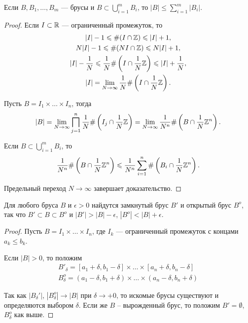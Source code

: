 \begin{property}
    \label{brus-prop1}
    Если $B, B_1, \ldots, B_m$ --- брусы и $B \subset \bigcup_{i = 1}^m B_i$, то $|B| \le \sum_{i = 1}^m |B_i|$.

    \begin{proof}
        Если $I \subset \mathbb{R}$ --- ограниченный промежуток, то
        \begin{gather*}
            |I| - 1 \leqslant \#(I \cap \mathbb{Z}) \leqslant |I| + 1,\\
            N|I| - 1 \leqslant \#(NI \cap \mathbb{Z}) \leqslant N|I| + 1,\\
            |I| - \frac{1}{N} \leqslant \frac{1}{N}\#\left(I \cap \frac{1}{N}\mathbb{Z}\right) \leqslant |I| + \frac{1}{N},\\
            |I| = \lim_{N \rightarrow \infty} \frac{1}{N}\#\left(I \cap \frac{1}{N}\mathbb{Z}\right).
        \end{gather*}

        Пусть $B = I_1 \times \ldots \times I_n$, тогда
        \[
            |B| = \lim_{N \rightarrow \infty} \bigsqcap_{j = 1}^n \frac{1}{N} \#\left(I_j \cap \frac{1}{N}\mathbb{Z}\right) = \lim_{N \rightarrow \infty} \frac{1}{N^n} \#\left(B \cap \frac{1}{N}\mathbb{Z}^n\right).
        \]

        Если $B \subset \bigcup_{i = 1}^m B_i$, то
        \[
            \frac{1}{N^n} \#\left(B \cap \frac{1}{N}\mathbb{Z}^n\right) \leqslant \frac{1}{N^n} \sum_{i = 1}^n \#\left(B_{i} \cap \frac{1}{N}\mathbb{Z}^n\right).
        \]

        Предельный переход $N \rightarrow \infty$ завершает доказательство.
    \end{proof}
\end{property}

\begin{property}
    \label{brus-prop2}
    Для любого бруса $B$ и $\epsilon > 0$ найдутся замкнутый брус $B'$ и открытый брус $B^o$, так что $B' \subset B \subset B^o$ и $|B'| > |B| - \epsilon$, $|B^o| < |B| + \epsilon$.

    \begin{proof}
        Пусть $B = I_1 \times \ldots \times I_n$, где $I_k$ --- ограниченный промежуток с концами $a_k \le b_k$.

        Если $|B| > 0$, то положим
        \begin{gather*}
            B'_\delta = [a_1 + \delta, b_1 - \delta] \times \ldots \times [a_n + \delta, b_n - \delta]\\
            B_\delta^o = (a_1 - \delta, b_1 + \delta) \times \ldots \times (a_n - \delta, b_n + \delta)
        \end{gather*}

        Так как $|B_{\delta}'|$, $|B_{\delta}^{o}| \to |B|$ при $\delta \to +0$, то искомые брусы существуют и определяются выбором $\delta$. Если же $B$ -- вырожденный брус, то положим $B' = \emptyset$, $B_{\delta}^{o}$ как выше.
    \end{proof}
\end{property}

